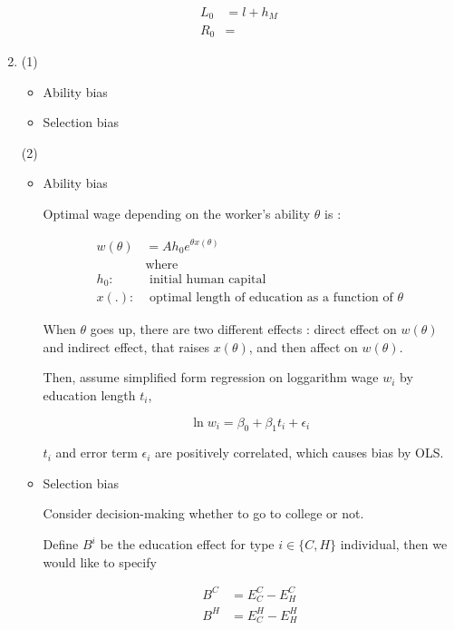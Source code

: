 \documentclass[dvipdfmx]{jsarticle}
\begin{document}
\begin{enumerate}
  \begin{align*}
  L_0 &= l + h_M \\
  R_0 &= 
  \end{align*}
 
 \item
 
 (1) 
  \begin{itemize}
  
  \item Ability bias
  
  \item Selection bias
  
  \end{itemize}
 
 (2) 
  \begin{itemize}
  
  \item Ability bias
  
  Optimal wage depending on the worker's ability $\theta$ is : 
  
   \begin{align*}
   w(\theta) & = A h_0 e^{\theta x(\theta)} \\
   & \text{where } \\
   h_0 : & \text{ initial human capital} \\
   x(.) : & \text{ optimal length of education as a function of } \theta
   \end{align*}
  
  When $\theta$ goes up, there are two different effects : direct effect on $w(\theta)$ and indirect effect, that raises $x(\theta)$, and then affect on $w(\theta)$.
  
  Then, assume simplified form regression on loggarithm wage $w_i$ by education length $t_i$,
  
  \[ \ln w_i = \beta_0 + \beta_1 t_i + \epsilon_i \]
  
  $t_i$ and error term $\epsilon_i$ are positively correlated, which causes bias by OLS.
  
  \item Selection bias
  
  Consider decision-making whether to go to college or not.
  
  Define $B^i$ be the education effect for type $i \in \{ C, H \}$ individual, then we would like to specify
  
   \begin{align*}
   B^C &= E_C^C - E_H^C \\
   B^H &= E_C^H - E_H^H \\
   \end{align*}
  

\end{itemize}
\end{enumerate}
\end{document}
